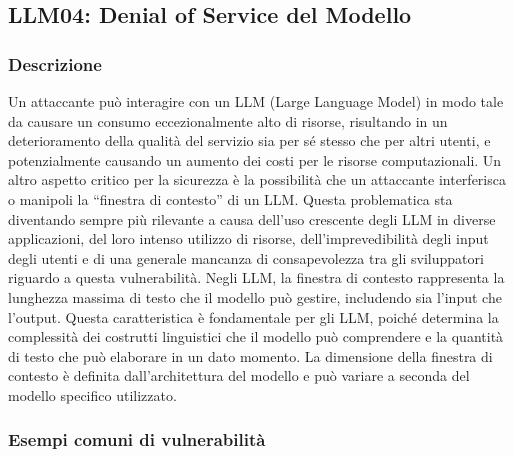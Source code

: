 \documentclass[
]{article}
\author{}
\date{}
\begin{document}
\subsection{LLM04: Denial of Service del
Modello}\label{llm04-denial-of-service-del-modello}

\subsubsection{Descrizione}\label{descrizione}

Un attaccante può interagire con un LLM (Large Language Model) in modo
tale da causare un consumo eccezionalmente alto di risorse, risultando
in un deterioramento della qualità del servizio sia per sé stesso che
per altri utenti, e potenzialmente causando un aumento dei costi per le
risorse computazionali. Un altro aspetto critico per la sicurezza è la
possibilità che un attaccante interferisca o manipoli la ``finestra di
contesto'' di un LLM. Questa problematica sta diventando sempre più
rilevante a causa dell'uso crescente degli LLM in diverse applicazioni,
del loro intenso utilizzo di risorse, dell'imprevedibilità degli input
degli utenti e di una generale mancanza di consapevolezza tra gli
sviluppatori riguardo a questa vulnerabilità. Negli LLM, la finestra di
contesto rappresenta la lunghezza massima di testo che il modello può
gestire, includendo sia l'input che l'output. Questa caratteristica è
fondamentale per gli LLM, poiché determina la complessità dei costrutti
linguistici che il modello può comprendere e la quantità di testo che
può elaborare in un dato momento. La dimensione della finestra di
contesto è definita dall'architettura del modello e può variare a
seconda del modello specifico utilizzato.

\subsubsection{Esempi comuni di
vulnerabilità}\label{esempi-comuni-di-vulnerabilituxe0}
\end{document}
